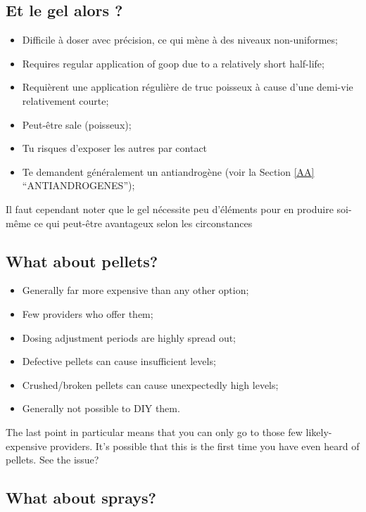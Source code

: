 \documentclass{article}
\begin{document}
\subsection{Et le gel alors ?}

\begin{itemize}
  \item Difficile à doser avec précision, ce qui mène à des niveaux non-uniformes;
  \item Requires regular application of goop due to a relatively short half-life;
  \item Requièrent une application régulière de truc poisseux à cause d'une demi-vie relativement courte;
  \item Peut-être sale (poisseux);
  \item Tu risques d'exposer les autres par contact
  \item Te demandent généralement un antiandrogène (voir la  Section \ref{AA} “ANTIANDROGENES”);
\end{itemize}

Il faut cependant noter que le gel nécessite peu d'éléments pour en produire soi-même ce qui peut-être avantageux selon les circonstances

\subsection{What about pellets?}

\begin{itemize}
  \item Generally far more expensive than any other option;
  \item Few providers who offer them;
  \item Dosing adjustment periods are highly spread out;
  \item Defective pellets can cause insufficient levels;
  \item Crushed/broken pellets can cause unexpectedly high levels;
  \item Generally not possible to DIY them.
\end{itemize}

The last point in particular means that you can only go to those few likely-expensive providers. It’s possible that this is the first time you have even heard of pellets. See the issue?

\subsection{What about sprays?}
\end{document}
